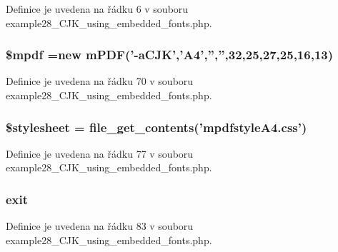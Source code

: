 Definice je uvedena na řádku 6 v souboru example28\-\_\-\-C\-J\-K\-\_\-using\-\_\-embedded\-\_\-fonts.\-php.

\hypertarget{example28___c_j_k__using__embedded__fonts_8php_ad028f81910d6cbab9b184d2214b3a8f8}{
\subsubsection[{\$mpdf}]{\setlength{\rightskip}{0pt plus 5cm}\$mpdf =new {\bf m\-P\-D\-F}('-\/a\-C\-J\-K','A4','','',32,25,27,25,16,13)}}\label{example28___c_j_k__using__embedded__fonts_8php_ad028f81910d6cbab9b184d2214b3a8f8}


Definice je uvedena na řádku 70 v souboru example28\-\_\-\-C\-J\-K\-\_\-using\-\_\-embedded\-\_\-fonts.\-php.

\hypertarget{example28___c_j_k__using__embedded__fonts_8php_a19e5cf73e817c55a49205e6ec78c88a8}{
\subsubsection[{\$stylesheet}]{\setlength{\rightskip}{0pt plus 5cm}\$stylesheet = file\-\_\-get\-\_\-contents('mpdfstyle\-A4.\-css')}}\label{example28___c_j_k__using__embedded__fonts_8php_a19e5cf73e817c55a49205e6ec78c88a8}


Definice je uvedena na řádku 77 v souboru example28\-\_\-\-C\-J\-K\-\_\-using\-\_\-embedded\-\_\-fonts.\-php.

\hypertarget{example28___c_j_k__using__embedded__fonts_8php_a6733eb5f605d09eaede9845835d71c4e}{
\subsubsection[{exit}]{\setlength{\rightskip}{0pt plus 5cm}exit}}\label{example28___c_j_k__using__embedded__fonts_8php_a6733eb5f605d09eaede9845835d71c4e}


Definice je uvedena na řádku 83 v souboru example28\-\_\-\-C\-J\-K\-\_\-using\-\_\-embedded\-\_\-fonts.\-php.

